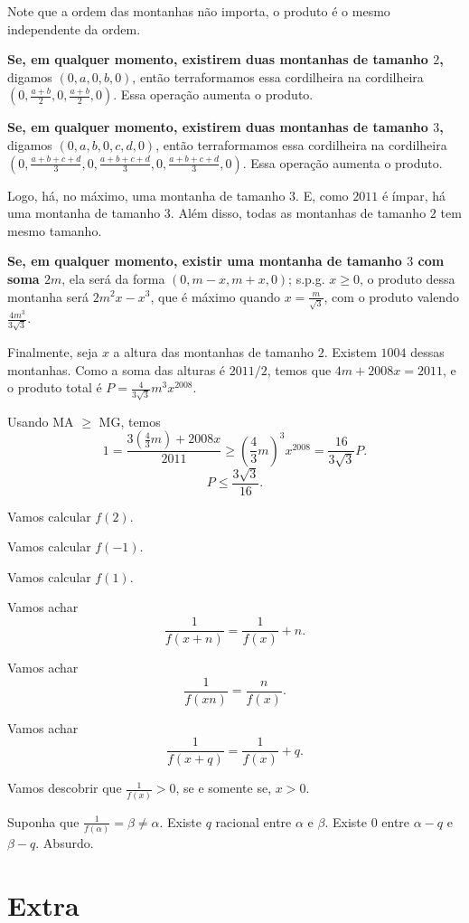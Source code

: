 \documentclass[10pt,a4paper]{article}
\begin{document}
\begin{sk}
		Note que a ordem das montanhas não importa, o produto é o mesmo independente da ordem.

		\textbf{\boldmath Se, em qualquer momento, existirem duas montanhas de tamanho $2$,} digamos $(0, a, 0, b, 0)$, então terraformamos essa cordilheira na cordilheira $(0, \frac{a+b}{2}, 0, \frac{a+b}{2}, 0)$. Essa operação aumenta o produto.

		\textbf{\boldmath Se, em qualquer momento, existirem duas montanhas de tamanho $3$,} digamos $(0, a, b, \allowbreak 0, c, d, 0)$, então terraformamos essa cordilheira na cordilheira $(0, \frac{a+b+c+d}{3}, 0, \frac{a+b+c+d}{3}, 0, \frac{a+b+c+d}{3}, 0)$. Essa operação aumenta o produto.

		Logo, há, no máximo, uma montanha de tamanho $3$. E, como $2011$ é ímpar, há uma montanha de tamanho $3$. Além disso, todas as montanhas de tamanho $2$ tem mesmo tamanho.

		\textbf{\boldmath Se, em qualquer momento, existir uma montanha de tamanho $3$ com soma $2m$}, ela será da forma $(0, m - x, m + x, 0)$; s.p.g. $x \ge 0$, o produto dessa montanha será $2m^2x - x^3$, que é máximo quando $x = \frac{m}{\sqrt{3}}$, com o produto valendo $\frac{4m^3}{3\sqrt{3}}$.

		Finalmente, seja $x$ a altura das montanhas de tamanho $2$. Existem $1004$ dessas montanhas. Como a soma das alturas é $2011/2$, temos que $4m + 2008x = 2011$, e o produto total é $P = \frac{4}{3\sqrt{3}} m^3x^{2008}$.

		Usando MA $\ge$ MG, temos \[
			1 = \frac{3\left(\frac{4}{3}m\right) + 2008x}{2011} \ge \left(\frac{4}{3}m\right)^3x^{2008} = \frac{16}{3\sqrt{3}} P.
		\]
		\[
			P \le \frac{3\sqrt{3}}{16}.
		\]
	\end{sk}

	\newpage

	\begin{sk}
		Vamos calcular $f(2)$.
	
		Vamos calcular $f(-1)$.
	
		Vamos calcular $f(1)$.
	
		Vamos achar \[\frac{1}{f(x + n)} = \frac{1}{f(x)} + n.\]
	
		Vamos achar \[ \frac{1}{f(xn)} = \frac{n}{f(x)}.  \]
	
		Vamos achar \[\frac{1}{f(x + q)} = \frac{1}{f(x)} + q.\]
	
		Vamos descobrir que $\frac{1}{f(x)} > 0$, se e somente se, $x > 0$.
	
		Suponha que $\frac{1}{f(\alpha)} = \beta \neq \alpha$. 
		Existe $q$ racional entre $\alpha$ e $\beta$. Existe $0$ entre $\alpha - q$ e $\beta - q$. Absurdo.
	\end{sk}

	\newpage
	\section*{Extra}
\end{document}
